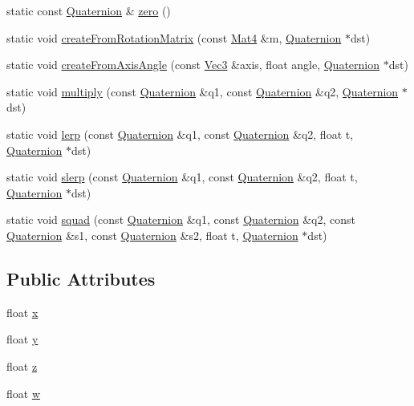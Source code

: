 \begin{DoxyCompactItemize}
static const \hyperlink{classQuaternion}{Quaternion} \& \hyperlink{classQuaternion_ab43289b15be2b706934d497cfcbe8fbe}{zero} ()
\item 
static void \hyperlink{classQuaternion_ab2e025a41afe07fc641df593bda3d377}{create\+From\+Rotation\+Matrix} (const \hyperlink{classMat4}{Mat4} \&m, \hyperlink{classQuaternion}{Quaternion} $\ast$dst)
\item 
static void \hyperlink{classQuaternion_abb750077ff3f44f0deb309ee2a733f89}{create\+From\+Axis\+Angle} (const \hyperlink{classVec3}{Vec3} \&axis, float angle, \hyperlink{classQuaternion}{Quaternion} $\ast$dst)
\item 
static void \hyperlink{classQuaternion_a7703494347997831de3c4d836355f6bb}{multiply} (const \hyperlink{classQuaternion}{Quaternion} \&q1, const \hyperlink{classQuaternion}{Quaternion} \&q2, \hyperlink{classQuaternion}{Quaternion} $\ast$dst)
\item 
static void \hyperlink{classQuaternion_a3bbac8b25450a8653a8bca2467cd9cb2}{lerp} (const \hyperlink{classQuaternion}{Quaternion} \&q1, const \hyperlink{classQuaternion}{Quaternion} \&q2, float t, \hyperlink{classQuaternion}{Quaternion} $\ast$dst)
\item 
static void \hyperlink{classQuaternion_a4dd2d3bf98210b5af0451e6cc92a7113}{slerp} (const \hyperlink{classQuaternion}{Quaternion} \&q1, const \hyperlink{classQuaternion}{Quaternion} \&q2, float t, \hyperlink{classQuaternion}{Quaternion} $\ast$dst)
\item 
static void \hyperlink{classQuaternion_a77eb00899b99bd31fbb74dfecc258820}{squad} (const \hyperlink{classQuaternion}{Quaternion} \&q1, const \hyperlink{classQuaternion}{Quaternion} \&q2, const \hyperlink{classQuaternion}{Quaternion} \&s1, const \hyperlink{classQuaternion}{Quaternion} \&s2, float t, \hyperlink{classQuaternion}{Quaternion} $\ast$dst)
\end{DoxyCompactItemize}
\subsection*{Public Attributes}
\begin{DoxyCompactItemize}
\item 
float \hyperlink{classQuaternion_a8b80f191a3155cc0158d2b4f4d50b2cb}{x}
\item 
float \hyperlink{classQuaternion_a3bd3f270462944423611f44e19d2511b}{y}
\item 
float \hyperlink{classQuaternion_a625cb732d8ff3083e7852b86b736ab29}{z}
\item 
float \hyperlink{classQuaternion_aa44a65ab99e36f6ab8771030eed8a7ad}{w}
\end{DoxyCompactItemize}
